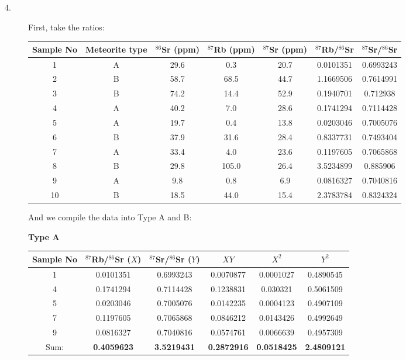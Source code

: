\begin{description}
\item[4.] First, take the ratios:
  \begin{center}
    \begin{tabular}{ccccccc}
      Sample No & Meteorite type & $^{86}$Sr (ppm) & $^{87}$Rb (ppm)
        & $^{87}$Sr (ppm) & $^{87}$Rb/$^{86}$Sr & $^{87}$Sr/$^{86}$Sr\\
      \hline
      1  & A & 29.6 & 0.3   & 20.7 & 0.0101351 & 0.6993243\\
      2  & B & 58.7 & 68.5  & 44.7 & 1.1669506 & 0.7614991\\
      3  & B & 74.2 & 14.4  & 52.9 & 0.1940701 & 0.712938\\
      4  & A & 40.2 & 7.0   & 28.6 & 0.1741294 & 0.7114428\\
      5  & A & 19.7 & 0.4   & 13.8 & 0.0203046 & 0.7005076\\
      6  & B & 37.9 & 31.6  & 28.4 & 0.8337731 & 0.7493404\\
      7  & A & 33.4 & 4.0   & 23.6 & 0.1197605 & 0.7065868\\
      8  & B & 29.8 & 105.0 & 26.4 & 3.5234899 & 0.885906\\
      9  & A & 9.8  & 0.8   & 6.9  & 0.0816327 & 0.7040816\\
      10 & B & 18.5 & 44.0  & 15.4 & 2.3783784 & 0.8324324\\
    \end{tabular}
  \end{center}

  And we compile the data into Type A and B:

  \begin{center}
    \textbf{Type A}

    \medskip
    \begin{tabular}{cccccc}
      Sample No & $^{87}$Rb/$^{86}$Sr ($X$) & $^{87}$Sr/$^{86}$Sr ($Y$)
        & $XY$ & $X^2$ & $Y^2$\\
      \hline
      1 & 0.0101351 & 0.6993243 & 0.0070877 & 0.0001027 & 0.4890545\\
      4 & 0.1741294 & 0.7114428 & 0.1238831 & 0.030321  & 0.5061509\\
      5 & 0.0203046 & 0.7005076 & 0.0142235 & 0.0004123 & 0.4907109\\
      7 & 0.1197605 & 0.7065868 & 0.0846212 & 0.0143426 & 0.4992649\\
      9 & 0.0816327 & 0.7040816 & 0.0574761 & 0.0066639 & 0.4957309\\
      \hline
      Sum: & \textbf{0.4059623} & \textbf{3.5219431} & \textbf{0.2872916}
        & \textbf{0.0518425} & \textbf{2.4809121}\\
    \end{tabular}
  \end{center}


\end{description}
